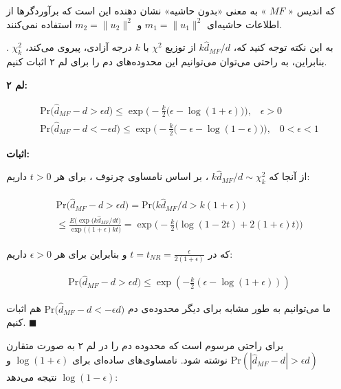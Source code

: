 که اندیس «
$MF$
» به معنی «بدون حاشیه»%
نشان دهنده این است که برآوردگرها از اطلاعات حاشیه‌ای 
$m_1 = \| u_1 \|^2$
و 
$m_2 = \| u_2 \|^2$
استفاده نمی‌کنند.

به این نکته توجه کنید که، 
$k \hat{d}_{MF} / d$
از توزیع 
$\chi^2$
با 
$k$
درجه آزادی، پیروی می‌کند،
$\chi_k^2$
. بنابراین، به راحتی می‌توان می‌توانیم این محدوده‌‌های دم را برای لم ۲ اثبات کنیم.

\textbf{
لم ۲:
}

\begin{align}
\mathrm{Pr} \big( \hat{d}_{MF} - d > \epsilon d) \leq \exp \Bigg( - \frac{k}{2} \big( \epsilon - \log( 1+ \epsilon) \big) \Bigg), \;\;\; \epsilon > 0 
\label{eq:1iE} \\
\mathrm{Pr} \big( \hat{d}_{MF} - d < -\epsilon d) \leq \exp \Bigg( - \frac{k}{2} \big( -\epsilon - \log( 1 - \epsilon) \big) \Bigg), \;\;\; 0 < \epsilon < 1 
\label{eq:1iF} 
\end{align}

\textbf{
اثبات:
}

از آنجا که 
$k \hat{d}_{MF} / d \sim \chi_k^2 $
، بر اساس نامساوی چرنوف%
\cite{litez46}
، برای هر 
$t > 0$ 
داریم:

\begin{align}
\begin{split}
\mathrm{Pr} \big( \hat{d}_{MF} - d > \epsilon d) = 
\mathrm{Pr} \big( k \hat{d}_{MF} / d > k(1+\epsilon) \big) \\
\leq 
\frac{E\bigg( \exp (k \hat{d}_{MF} /dt \bigg) }{\exp \big( (1+\epsilon ) kt \big) } =
\exp \Bigg( - \frac{k}{2} \big( \log (1-2t) + 2(1 + \epsilon) t \big) \Bigg)
\end{split}
\label{eq:1iG}
\end{align}

که در 
$t = t_{NR} = \frac{\epsilon}{2(1+\epsilon)}$
و بنابراین برای هر 
$\epsilon > 0$
داریم:

\begin{align}
\mathrm{Pr} \big( \hat{d}_{MF} - d > \epsilon d) \leq \exp \left( -\frac{k}{2} \left( \epsilon - \log \left( 1 + \epsilon \right) \right) \right)
\label{eq:1iH}
\end{align}

ما می‌توانیم به طور مشابه برای دیگر محدوده‌ی دم 
$\mathrm{Pr} \big( \hat{d}_{MF} - d < -\epsilon d)$
هم اثبات کنیم.
$\blacksquare$

\bigskip

برای راحتی مرسوم است که محدوده دم را در لم ۲ به صورت متقارن 
$\mathrm{Pr} \left( \left| \hat{d}_{MF} - d \right| > \epsilon d \right)$
نوشته شود. نامساوی‌های ساده‌ای برای 
$\log(1+\epsilon)$
و 
$\log(1-\epsilon)$
نتیجه می‌دهد:

